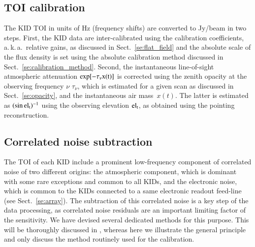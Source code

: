 \documentclass[traditionalabstract]{aa}
\newcommand{\elev}{\rm{el}}
\newcommand{\aka}{a.\,k.\,a.}
\newcommand{\taunu}{\tau_{\nu}}
\newcommand{\airmass}{air mass}
\newcommand{\lp}[1]{#1}
\begin{document}
\subsection{TOI calibration}
\label{se:flux_calib}
The KID TOI in units of Hz (frequency shifts) are converted to
Jy/beam in two steps. First, the KID data are inter-calibrated using the
calibration coefficients, \aka\ relative gains, 
as discussed in Sect.~\ref{se:flat_field} and the
absolute scale of the flux density is set using the absolute
calibration method discussed in
Sect.~\ref{se:calibration_method}. Second, the instantaneous line-of-sight
atmospheric attenuation $\rm{exp}[{-\taunu x(t)}]$ is corrected
using the zenith opacity at the observing frequency $\nu$ $\taunu$, which is estimated for a given scan
as discussed in Sect.~\ref{se:opacity}, and the instantaneous \airmass\
$x(t)$. {\lp The latter is estimated as $(\sin \elev_t)^{-1}$ using the observing elevation
$\elev_t$, as obtained using the pointing reconstruction.}     

\subsection{Correlated noise subtraction}
\label{se:toi_proc}
The TOI of each KID include a prominent low-frequency component of correlated noise of two
different origins: the atmospheric component, which is dominant
{\lp with some rare exceptions} and common to all KIDs, and the electronic noise, which is common to the KIDs connected
to a same electronic readout feed-line (see
Sect.~\ref{se:array}). The subtraction of this correlated noise is a key
step of the data processing, as correlated noise residuals are an
important limiting factor of the sensitivity. We have devised several
dedicated methods for this purpose. This will be thoroughly
discussed in \citet{Ponthieu2019}, whereas here we illustrate the
general principle and only discuss the method routinely used for
the calibration.
\end{document}
